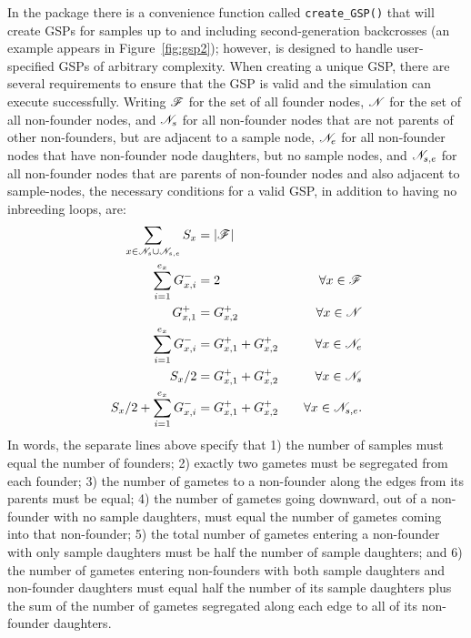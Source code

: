 In the \gscramble{} package there is a convenience function called {\footnotesize\tt create\_GSP()} that
will create GSPs for samples up to and including second-generation backcrosses (an example appears in Figure~\ref{fig:gsp2});
however, \gscramble{} is designed
to handle user-specified GSPs of arbitrary complexity.  When creating a unique GSP,
there are several requirements to ensure that the GSP is valid
and the simulation can execute successfully.
Writing $\mathscr{F}$ for the set of all founder nodes, $\mathscr{N}$ for the set of all non-founder nodes, and $\mathscr{N}_s$ for all non-founder
nodes that are not parents of other non-founders, but are adjacent to a sample node, $\mathscr{N}_e$ for all
non-founder nodes that have non-founder node daughters, but no sample nodes, and $\mathscr{N}_{s,e}$ for all
non-founder nodes that are parents of non-founder nodes and also adjacent to sample-nodes, the necessary conditions
for a valid GSP, in addition to having no inbreeding loops, are:
\begin{equation}
\begin{aligned}
\sum_{x \in \mathscr{N}_s \cup \mathscr{N}_{s,e}} S_x &= |\mathscr{F}| &  \\
\sum_{i=1}^{e_x} G^-_{x,i} &= 2 & \forall x \in \mathscr{F} \\
G^+_{x,1} &= G^+_{x,2} & \forall x \in \mathscr{N} \\
\sum_{i=1}^{e_x} G^-_{x,i} &= G^+_{x,1} +  G^+_{x,2} & \forall x \in \mathscr{N}_e  \\
 S_x/2  &= G^+_{x,1} +  G^+_{x,2} & ~~~\forall x \in \mathscr{N}_s \\
 S_x/2 + \sum_{i=1}^{e_x} G^-_{x,i} &= G^+_{x,1} +  G^+_{x,2} & ~~~\forall x \in \mathscr{N}_{s,e}.  \\
\end{aligned}
\end{equation}
In words, the separate lines above specify that 1) the number of samples
must equal the number of founders; 2) exactly two gametes must be
segregated from each founder; 3) the number of gametes to a non-founder along the 
edges from its parents must be equal; 
4) the number of gametes going downward, out of a non-founder with no sample
daughters, must equal the number of gametes coming into that non-founder;
5)  the total number of gametes entering a non-founder with only sample daughters
must be half the number of sample daughters; and 6) the number of gametes
entering non-founders with both sample daughters and non-founder daughters must
equal half the number of its sample daughters plus the sum of the number of gametes segregated
along each edge to all of its non-founder daughters.

